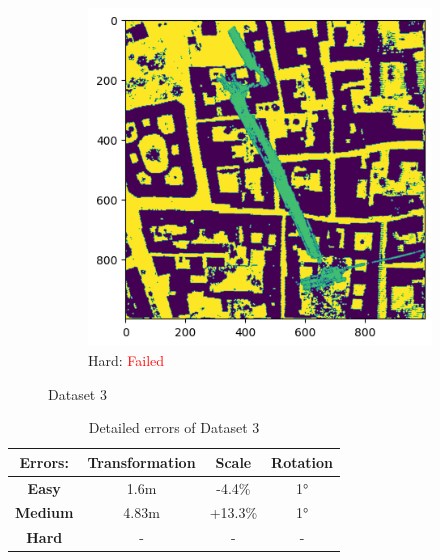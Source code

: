 \documentclass[11pt]{article}
\begin{document}
\begin{figure}[p]
        \vspace{1em}

        \begin{subfigure}{0.45\textwidth}
            \centering
            \includegraphics[width=\linewidth]{images/full/hard/5_1_2_hard}
            \caption{Hard: \textcolor{red}{Failed}}
            \label{fig:5_1_2_hard}
        \end{subfigure}
        \hfill

        \caption{Dataset 3}
        \label{fig:res_5_1_2}
    \end{figure}

    \begin{table}[p]
        \centering
        \begin{tabular}{|c|c|c|c|}
          \hline
          \textbf{Errors:} & \textbf{Transformation} & \textbf{Scale} & \textbf{Rotation} \\
          \hline
          \textbf{Easy}   & 1.6m & -4.4\%  & 1° \\
          \hline
          \textbf{Medium} & 4.83m  & +13.3\% & 1° \\
          \hline
          \textbf{Hard}   & -  & - & - \\
          \hline
        \end{tabular}
        \caption{Detailed errors of Dataset 3}
        \label{tab:tab_3}
    \end{table}
\end{document}
